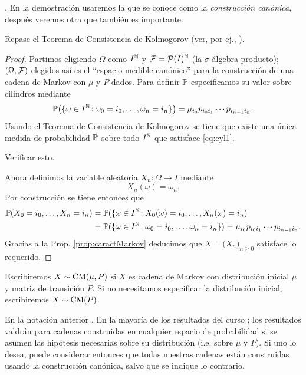 .
En la demostración usaremos la que se conoce como la \emph{construcción canónica}, después veremos otra que también es importante.

\begin{sqgnote}
Repase el Teorema de Consistencia de Kolmogorov (ver, por ej., \cite{medidaJSM}).
\end{sqgnote}

\begin{proof}
Partimos eligiendo $\Omega$ como $I^{\mathbb{N}}$ y $\mathcal{F}=\mathcal{P}(I)^{\mathbb{N}}$ (la $\sigma$-álgebra producto); $(\Omega,\mathcal{F})$ elegidos así es el ``espacio medible canónico'' para la construcción de una cadena de Markov con $\mu$ y $P$ dados.
Para definir $\mathbb{P}$ especificamos su valor sobre cilindros mediante
\begin{equation}\label{eq:cyl1}
\mathbb{P}\big(\{\omega\in I^{\mathbb{N}}\!:\omega_{0}=i_0,\dotsc,\omega_n=i_n\}\big)=\mu_{i_0}p_{i_0i_1}\dotsm p_{i_{n-1}i_n}.
\end{equation}
Usando el Teorema de Consistencia de Kolmogorov se tiene que existe una única medida de probabilidad $\mathbb{P}$ sobre todo $I^{\mathbb{N}}$ que satisface \eqref{eq:cyl1}.

\begin{exer}
Verificar esto.
\end{exer}

\noindent Ahora definimos la variable aleatoria $X_n\!:\Omega\longrightarrow I$ mediante
\[X_n(\omega)=\omega_n.\]
Por construcción se tiene entonces que
\begin{align}
\mathbb{P}(X_0=i_0,\dotsc,X_n=i_n)&=\mathbb{P}(\{\omega\in I^{\mathbb{N}}\!:X_0(\omega)=i_0,\dotsc,X_n(\omega)=i_n)\\
&=\mathbb{P}(\{\omega\in I^{\mathbb{N}}\!:\omega_{0}=i_0,\dotsc,\omega_n=i_n\})=\mu_{i_0}p_{i_0i_1}\dotsm p_{i_{n-1}i_n}.
\end{align}
Gracias a la Prop. \ref{prop:caractMarkov} deducimos que $X=\big(X_n\big)_{n\geq0}$ satisface lo requerido.
\end{proof}

\begin{notation}
Escribiremos $X\sim\text{\upshape{CM}}(\mu,P)$ si $X$ es cadena de Markov con distribución inicial $\mu$ y matriz de transición $P$.
Si no necesitamos especificar la distribución inicial, escribiremos $X\sim\text{\upshape{CM}}(P)$.
\end{notation}

En la notación anterior .
En la mayoría de los resultados del curso ; los resultados valdrán para cadenas construidas en cualquier espacio de probabilidad si se asumen las hipótesis necesarias sobre su distribución (i.e. sobre $\mu$ y $P$).
Si uno lo desea, puede considerar entonces que todas nuestras cadenas están construidas usando la construcción canónica, salvo que se indique lo contrario.

